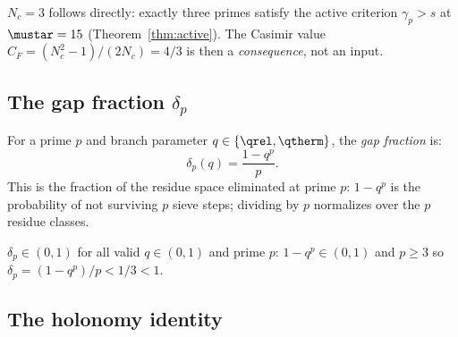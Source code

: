 \documentclass[12pt,a4paper]{article}
\begin{document}
$N_c = 3$ follows directly: exactly three primes satisfy the
active criterion $\gamma_p > s$ at $\mustar = 15$
(Theorem~\ref{thm:active}). The Casimir value
$C_F = (N_c^2 - 1)/(2N_c) = 4/3$ is then a \emph{consequence},
not an input.

\subsection{The gap fraction $\delta_p$}
\label{sec:delta_p}

\begin{definition}
\label{def:delta}
For a prime $p$ and branch parameter $q \in \{\qrel, \qtherm\}$,
the \emph{gap fraction} is:
\begin{equation}
  \delta_p(q) = \frac{1 - q^p}{p}.
  \label{eq:delta_def}
\end{equation}
This is the fraction of the residue space eliminated at prime $p$:
$1 - q^p$ is the probability of not surviving $p$ sieve steps;
dividing by $p$ normalizes over the $p$ residue classes.
\end{definition}

\begin{remark}
$\delta_p \in (0, 1)$ for all valid $q \in (0,1)$ and prime $p$:
$1 - q^p \in (0,1)$ and $p \geq 3$ so $\delta_p = (1-q^p)/p < 1/3 < 1$.
\end{remark}

\subsection{The holonomy identity}
\label{sec:holonomy_id}
\end{document}
